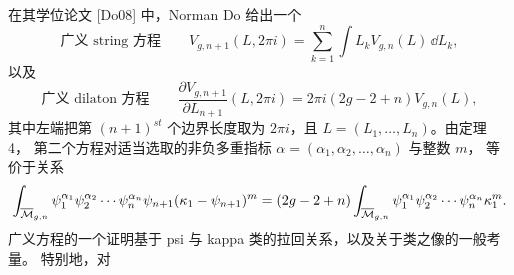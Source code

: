 在其学位论文 [Do08] 中，Norman Do 给出一个
\[
\text{广义 string 方程}\qquad
V_{g,n+1}(L,2\pi i)=\sum_{k=1}^{n}\int L_kV_{g,n}(L)\,\dd L_k,
\]
以及
\[
\text{广义 dilaton 方程}\qquad
\frac{\partial V_{g,n+1}}{\partial L_{n+1}}(L,2\pi i)
=2\pi i(2g-2+n)V_{g,n}(L),
\]
其中左端把第 $(n+1)^{st}$ 个边界长度取为 $2\pi i$，且 $L=(L_1,\dots,L_n)$。由定理 4，
第二个方程对适当选取的非负多重指标 $\alpha=(\alpha_1,\alpha_2,\dots,\alpha_n)$ 与整数 $m$，
等价于关系
\[
\int_{\overline{\mathcal{M}}_{g,n}}\psi_1^{\alpha_1}\psi_2^{\alpha_2}\cdots\psi_n^{\alpha_n}
\psi_{n+1}(\kappa_1-\psi_{n+1})^m
=(2g-2+n)\int_{\overline{\mathcal{M}}_{g,n}}\psi_1^{\alpha_1}\psi_2^{\alpha_2}\cdots\psi_n^{\alpha_n}\kappa_1^m.
\]
广义方程的一个证明基于 psi 与 kappa 类的拉回关系，以及关于类之像的一般考量。
特别地，对
